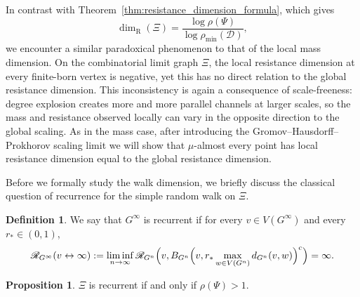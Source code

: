 \documentclass{article}
\theoremstyle{plain}
\theoremstyle{definition}
\newtheorem{definition}[theorem]{Definition}
\newtheorem{proposition}[theorem]{Proposition}
\newcommand{\Reff}{\mathscr{R}}
\newcommand{\dimresis}{\dim_\mathrm{R}}
\begin{document}
In contrast with Theorem~\ref{thm:resistance_dimension_formula}, which gives
\[
\dimresis(\Xi)=\frac{\log \rho(\Psi)}{\log \rho_{\min}(\mathcal D)},
\]
we encounter a similar paradoxical phenomenon to that of the local mass dimension.
On the combinatorial limit graph $\Xi$, the local resistance dimension at every finite-born vertex is negative, yet this has no direct relation to the global resistance dimension.
This inconsistency is again a consequence of scale-freeness: degree explosion creates more and more parallel channels at larger scales, so the mass and resistance observed locally can vary in the opposite direction to the global scaling.
As in the mass case, after introducing the Gromov--Hausdorff--Prokhorov scaling limit we will show that $\mu$-almost every point has local resistance dimension equal to the global resistance dimension.

Before we formally study the walk dimension, we briefly discuss the classical question of recurrence for the simple random walk on $\Xi$.

\begin{definition}\label{def:asymp_res_recurrence}
We say that $G^\infty$ is recurrent if for every $v\in V(G^\infty)$ and every $r_*\in(0,1)$,
\[
\Reff_{G^\infty}(v\leftrightarrow \infty)
:=
\liminf_{n\to\infty}
\Reff_{G^n}\Bigl(
v,
B_{G^n}\Bigl(v,r_*\max_{w\in V(G^n)} d_{G^n}(v,w)\Bigr)^{\mathrm c}
\Bigr)
=
\infty.
\]
\end{definition}

\begin{proposition}\label{prop:asymp_res_recurrence_rhoPsi}
$\Xi$ is recurrent if and only if $\rho(\Psi)>1$.
\end{proposition}
\end{document}
